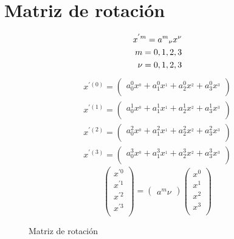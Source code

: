 \section{Matriz de rotaci\'on}

\begin{figure}[h]
		\begin{eqnarray*}
			x^{'m} = a^{m}\hfill_{\nu} x^{\nu}\\
			m = 0,1,2,3\\
			\nu = 0,1,2,3
		\end{eqnarray*}		
		\begin{eqnarray*}
			x^{'(0)} =
			\left( {\begin{array}{cc}
					a^{0} _0 x^{_0} + a^{0} _1 x^{_1} + a^{0} _2 x^{_2} + a^{0} _3 x^{_3}\\
			\end{array} } \right)\\
		x^{'(1)} =
		\left( {\begin{array}{cc}
				a^{1} _0 x^{_0} + a^{1} _1 x^{_1} + a^{1} _2 x^{_2} + a^{1} _3 x^{_3}\\
		\end{array} } \right)\\
		x^{'(2)} =
		\left( {\begin{array}{cc}
				a^{2} _0 x^{_0} + a^{2} _1 x^{_1} + a^{2} _2 x^{_2} + a^{2} _3 x^{_3}\\
		\end{array} } \right)\\
		x^{'(3)} =
		\left( {\begin{array}{cc}
				a^{3} _0 x^{_0} + a^{3} _1 x^{_1} + a^{3} _2 x^{_2} + a^{3} _3 x^{_3}\\
		\end{array} } \right)
		\end{eqnarray*}
		\begin{equation*}
			\left(
			\begin{array}{ccc}
				x^{'0}\\
				x^{'1}\\
				x^{'2}\\
				x^{'3}\\ 
			\end{array}
			\right)
			=
			\left(
			\begin{array}{c}
				a^{m}\nu
			\end{array}
			\right)
			{}
			\left(
			\begin{array}{ccc}
				x^{0}\\
				x^{1}\\
				x^{2}\\
				x^{3}\\ 
			\end{array}
			\right)
		\end{equation*}		
	\caption{Matriz de rotaci\'on}
	\label{permutaciones_tree}
\end{figure}